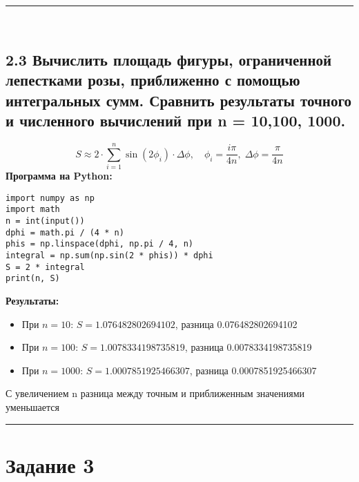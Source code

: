 \documentclass{article}
\begin{document}
\noindent\rule{\linewidth}{0.4pt}
\
\subsection*{2.3 Вычислить площадь фигуры, ограниченной лепестками розы, приближенно с помощью интегральных сумм. Сравнить результаты точного и численного вычислений при n = 10,100, 1000.}
\[
S \approx 2 \cdot \sum_{i=1}^{n} \sin(2\phi_i) \cdot \Delta\phi, \quad \phi_i = \frac{i\pi}{4n},\; \Delta\phi = \frac{\pi}{4n}
\]
\textbf{Программа на Python:}

\begin{lstlisting}
import numpy as np
import math
n = int(input())
dphi = math.pi / (4 * n)
phis = np.linspace(dphi, np.pi / 4, n)
integral = np.sum(np.sin(2 * phis)) * dphi
S = 2 * integral
print(n, S)
\end{lstlisting}

\textbf{Результаты:}

\begin{itemize}
  \item При $n=10$: \quad $S = 1.076482802694102$, \quad разница 0.076482802694102
  \item При $n=100$: \quad $S = 1.0078334198735819$, \quad разница 0.0078334198735819
  \item При $n=1000$: \quad $S = 1.0007851925466307$, \quad разница 0.0007851925466307
\end{itemize}
С увеличением n разница между точным и приближенным значениями уменьшается\\
\noindent\rule{\linewidth}{0.4pt}
\newpage
\section*{Задание 3}
\end{document}
